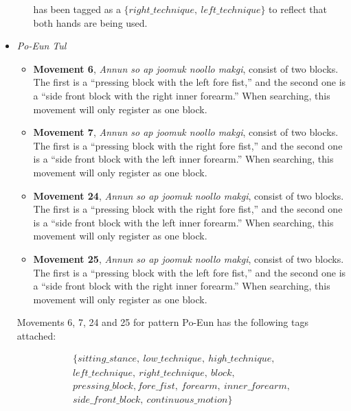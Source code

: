 \documentclass[10pt,twocolumn,a4paper]{article}
\begin{document}
\begin{itemize}
\begin{itemize}
        has been tagged as a $\{right\_technique, \: left\_technique\}$ to
        reflect that both hands are being used.
    \end{itemize}
  \item
    \emph{Po-Eun Tul}
    \begin{itemize}
      \item
        {\bf Movement 6}, \emph{Annun so ap joomuk noollo makgi}, consist of
        two blocks. The first is a ``pressing block with the left fore fist,''
        and the second one is a ``side front block with the right inner
        forearm.'' When searching, this movement will only register as one
        block.
      \item
        {\bf Movement 7}, \emph{Annun so ap joomuk noollo makgi}, consist of
        two blocks. The first is a ``pressing block with the right fore
        fist,'' and the second one is a ``side front block with the left inner
        forearm.'' When searching, this movement will only register as one
        block.
      \item
        {\bf Movement 24}, \emph{Annun so ap joomuk noollo makgi}, consist of
        two blocks. The first is a ``pressing block with the right fore
        fist,'' and the second one is a ``side front block with the left inner
        forearm.'' When searching, this movement will only register as one
        block.
      \item
        {\bf Movement 25}, \emph{Annun so ap joomuk noollo makgi}, consist of
        two blocks. The first is a ``pressing block with the left fore fist,''
        and the second one is a ``side front block with the right inner
        forearm.'' When searching, this movement will only register as one
        block.
    \end{itemize}

    Movements 6, 7, 24 and 25 for pattern Po-Eun has the following tags
    attached:

  \begin{align*}
    \{sitting\_stance, \: low\_technique, \: high\_technique, \\
    left\_technique, \: right\_technique, \: block, \\
    pressing\_block, fore\_fist, \: forearm, \: inner\_forearm, \\
    side\_front\_block, \: continuous\_motion\}
  \end{align*}


\end{itemize}
\end{document}
